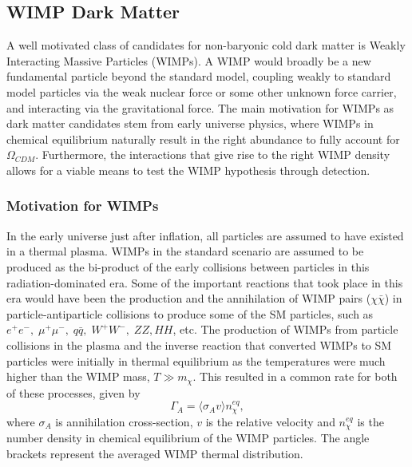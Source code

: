 \subsection{WIMP Dark Matter}
\label{subsec:wimp_dm}

A well motivated class of candidates for non-baryonic cold dark matter is Weakly Interacting Massive Particles (WIMPs). A WIMP would broadly be a new fundamental particle beyond the standard model, coupling weakly to standard model particles via the weak nuclear force or some other unknown force carrier, and interacting via the gravitational force. The main motivation for WIMPs as dark matter candidates stem from early universe physics, where WIMPs in chemical equilibrium naturally result in the right abundance to fully account for $\Omega_{CDM}$. Furthermore, the interactions that give rise to the right WIMP density allows for a viable means to test the WIMP hypothesis through detection.

\subsubsection{Motivation for WIMPs}
\label{subsubsec:motivation_wimps}

In the early universe just after inflation, all particles are assumed to have existed in a thermal plasma. WIMPs in the standard scenario are assumed to be produced as the bi-product of the early collisions between particles in this radiation-dominated era. Some of the important reactions that took place in this era would have been the production and the annihilation of WIMP pairs ($\chi{}\bar{\chi}$) in particle-antiparticle collisions to produce some of the SM particles, such as $e^{+}e^{-}, \; \mu^{+}\mu^{-}, \; q\bar{q}, \; W^{+}W^{-}, \; ZZ, HH$, etc. The production of WIMPs from particle collisions in the plasma and the inverse reaction that converted WIMPs to SM particles were initially in thermal equilibrium as the temperatures were much higher than the WIMP mass, $T \gg m_{\chi}$. This resulted in a common rate for both of these processes, given by
%
\begin{equation}
    \Gamma_{A} = \langle \sigma_{A}v \rangle n^{eq}_{\chi}, 
\end{equation}
%
where $\sigma_{A}$ is annihilation cross-section, $v$ is the relative velocity and $n_{\chi}^{eq}$ is the number density in chemical equilibrium of the WIMP particles. The angle brackets represent the averaged WIMP thermal distribution. 

